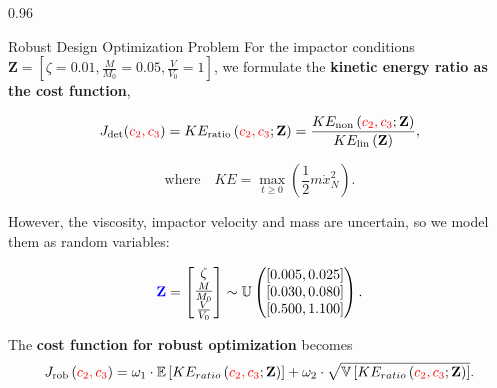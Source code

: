 \documentclass[final]{beamer}
\newcommand{\unif}{\mathbb{U}}
\newcommand{\bZ}{\ensuremath{\mathbf{Z}}}
\newlength{\colwidth}
\begin{document}
\begin{frame}[t]
\begin{columns}[t]
\begin{column}{0.96\colwidth}
\begin{block}{Robust Design Optimization Problem}
For the impactor conditions $\bZ = \left[\zeta = 0.01, \frac{M}{M_0}=0.05, \frac{V}{V_0}=1\right]$, 
we formulate the \textbf{kinetic energy ratio as the cost function},

\vspace{-1cm}

\begin{equation}\label{KE_ratio_cal}
J_{\mathrm{det}}(\textcolor{red}{c_2,c_3}) 
= KE_{\mathrm{ratio}}
    \left(\textcolor{red}{c_2,c_3}; \bZ\right)
    =
    \frac{
        KE_{\mathrm{non}}
        \left(
            \textcolor{red}{c_2,c_3};
            \bZ
        \right)
    }{
        KE_{\mathrm{lin}}
        \left(
            \bZ
        \right)
    },
\end{equation}

\vspace{-1cm}

\begin{equation}\label{KE_calc}
\text{where} \quad 
        KE= \max_{t\geq 0}
       \left(\frac{1}{2}m\dot{x}_N^2\right).
\end{equation}

\vspace{-0.5cm}

However, the viscosity, impactor velocity and mass are uncertain, so we model them as random variables:

\vspace{-1cm}
\begin{equation}\label{RV_distribution}
    \textcolor{blue}{\bZ} = \begin{bmatrix} 
        \zeta \\ 
        \frac{M}{M_0} \\ 
        \frac{V}{V_0}
    \end{bmatrix} \sim \unif \begin{pmatrix}
        [0.005, 0.025] \\ [0.030,0.080] \\ [0.500 ,1.100]
    \end{pmatrix}.
\end{equation}

\vspace{-0.5cm}
The \textbf{cost function for robust optimization} becomes 
\vspace{-0cm}
\begin{equation}\label{rob_cost}
    J_{\mathrm{rob}}\left(\textcolor{red}{c_2,c_3}\right)= 
    \omega_1 \cdot \mathbb{E} \left[KE_{ratio}
    \left( \textcolor{red}{c_2,c_3}; \mathbf{Z}\right)\right] 
    + \omega_2 \cdot \sqrt{\mathbb{V} 
    \left[KE_{ratio}\left(\textcolor{red}{c_2,c_3}; \mathbf{Z}\right)\right]}.
\end{equation}


\end{block}
\end{column}
\end{columns}
\end{frame}
\end{document}

